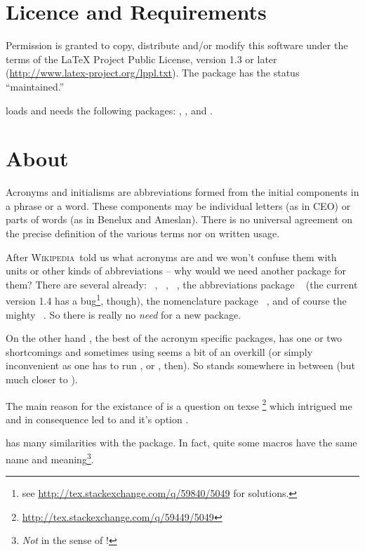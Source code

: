 \documentclass[DIV10,toc=index,toc=bib,hyperfootnotes=false]{cnpkgdoc}
\newcommand*\wikipedia{%
\textsc{Wikipedia}}
\begin{document}
\section{Licence and Requirements}
Permission is granted to copy, distribute and/or modify this software under the
terms of the \LaTeX{} Project Public License, version 1.3 or later
(\url{http://www.latex-project.org/lppl.txt}). The package has the status
``maintained.''

\acro loads and needs the following packages: ,
,  and .

\section{About}
\begin{zitat}
 Acronyms and initialisms are abbreviations formed from the initial components
 in a phrase or a word. These components may be individual letters (as in CEO)
 or parts of words (as in Benelux and Ameslan). There is no universal agreement
 on the precise definition of the various terms nor on written usage.
\end{zitat}
After \wikipedia\ told us what acronyms are and we won't confuse them with units
or other kinds of abbreviations -- why would we need another package for them?
There are several already: ~\cite{acronym}, %
~\cite{acromake}, ~\cite{acroterm}, the abbreviations package
~\cite{abbrevs} (the current version 1.4 has a bug\footnote{see
\url{http://tex.stackexchange.com/q/59840/5049} for solutions.}, though), the
nomenclature package ~\cite{nomencl}, and of course the mighty
~\cite{glossaries}. So there is really no \emph{need} for a
new package.

On the other hand , the best of the acronym specific packages,
has one or two shortcomings and sometimes using  seems a bit
of an overkill (or simply inconvenient as one has to run ,
 or , then). So \acro stands somewhere in between
(but much closer to ).

The main reason for the existance of \acro is a question on \acs{texse}%
\footnote{\url{http://tex.stackexchange.com/q/59449/5049}} which intrigued
me and in consequence led to \acro and it's option .

\acro has many similarities with the  package. In fact, quite
some macros have the same name and meaning\footnote{\emph{Not} in the sense of
\code{\textbackslash\textcolor{code}{meaning}}!}.
\end{document}
